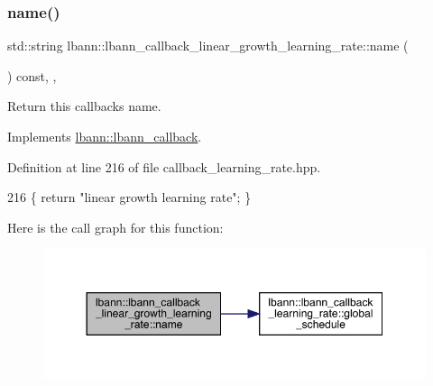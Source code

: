 \mbox{\label{classlbann_1_1lbann__callback__linear__growth__learning__rate_a6080051bd4de75dc1ca3d927414d2455}} 
\subsubsection{\texorpdfstring{name()}{name()}}
{\footnotesize\ttfamily std\+::string lbann\+::lbann\+\_\+callback\+\_\+linear\+\_\+growth\+\_\+learning\+\_\+rate\+::name (\begin{DoxyParamCaption}{ }\end{DoxyParamCaption}) const\hspace{0.3cm}{\ttfamily [inline]}, {\ttfamily [override]}, {\ttfamily [virtual]}}

Return this callback\textquotesingle{}s name. 

Implements \hyperlink{classlbann_1_1lbann__callback_a7522c7a14f1d6a1ea762cc2d7248eb3a}{lbann\+::lbann\+\_\+callback}.



Definition at line 216 of file callback\+\_\+learning\+\_\+rate.\+hpp.


\begin{DoxyCode}
216 \{ \textcolor{keywordflow}{return} \textcolor{stringliteral}{"linear growth learning rate"}; \}
\end{DoxyCode}
Here is the call graph for this function\+:\nopagebreak
\begin{figure}[H]
\begin{center}
\leavevmode
\includegraphics[width=350pt]{classlbann_1_1lbann__callback__linear__growth__learning__rate_a6080051bd4de75dc1ca3d927414d2455_cgraph}
\end{center}
\end{figure}
\mbox{\label{classlbann_1_1lbann__callback__linear__growth__learning__rate_acfc4f111a6a599f05523cde635cbbf6e}} 
